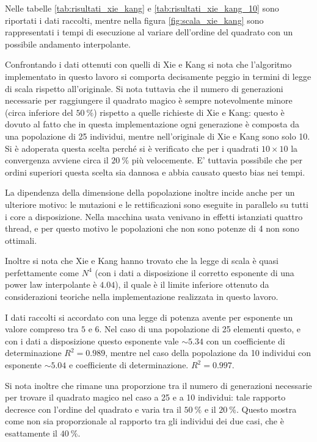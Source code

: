 \documentclass[italian,twoside,twocolumn]{article}
\begin{document}
Nelle tabelle \ref{tab:risultati_xie_kang} e \ref{tab:risultati_xie_kang_10}  sono riportati i dati raccolti, mentre nella figura \ref{fig:scala_xie_kang} sono rappresentati i tempi di esecuzione al variare dell'ordine del quadrato con un possibile andamento interpolante. 

Confrontando i dati ottenuti con quelli di Xie e Kang si nota che l'algoritmo implementato in questo lavoro si comporta decisamente peggio in termini di legge di scala rispetto all'originale. Si nota tuttavia che il numero di generazioni necessarie per raggiungere il quadrato magico è sempre notevolmente minore (circa inferiore del $ \SI{50}{\percent} $) rispetto a quelle richieste di Xie e Kang: questo è dovuto al fatto che in questa implementazione ogni generazione è composta da una popolazione di 25 individui, mentre nell'originale di Xie e Kang sono solo 10. Si è adoperata questa scelta perché si è verificato che per i quadrati $ 10\times 10 $ la convergenza avviene circa il $ \SI{20}{\percent} $ più velocemente. E' tuttavia possibile che per ordini superiori questa scelta sia dannosa e abbia causato questo bias nei tempi.

La dipendenza della dimensione della popolazione inoltre incide anche per un ulteriore motivo: le mutazioni e le rettificazioni sono eseguite in parallelo su tutti i core a disposizione. Nella macchina usata venivano in effetti istanziati quattro thread, e per questo motivo le popolazioni che non sono potenze di 4 non sono ottimali.

Inoltre si nota che Xie e Kang hanno trovato che la legge di scala è quasi perfettamente come $ N^4 $ (con i dati a disposizione il corretto esponente di una power law interpolante è $ \num{4.04} $), il quale è il limite inferiore ottenuto da considerazioni teoriche nella implementazione realizzata in questo lavoro.

I dati raccolti si accordato con una legge di potenza avente per esponente un valore compreso tra $ 5 $ e $ 6 $. Nel caso di una popolazione di 25 elementi questo, e con i dati a disposizione questo esponente vale $ \sim \num{5.34} $ con un coefficiente di determinazione $ R^2 = \num{0.989} $, mentre nel caso della popolazione da 10 individui con esponente $ \sim \num{5.04} $ e coefficiente di determinazione. $ R^2 = \num{0.997} $. 

Si nota inoltre che rimane una proporzione tra il numero di generazioni necessarie per trovare il quadrato magico nel caso a 25 e a 10 individui: tale rapporto decresce con l'ordine del quadrato e varia tra il $ \SI{50}{\percent} $ e il $ \SI{20}{\percent} $. Questo mostra come non sia proporzionale al rapporto tra gli individui dei due casi, che è esattamente il $ \SI{40}{\percent} $.
\end{document}
